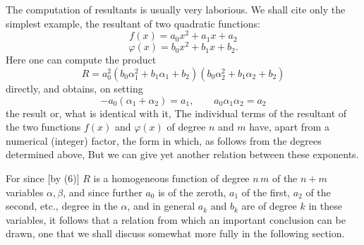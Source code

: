 
The computation of resultants is usually very laborious. We shall cite only the simplest example, the resultant of two quadratic functions:
\[
f(x) = a_0 x^2 + a_1 x + a_2
\]
\[
\varphi(x) = b_0 x^2 + b_1 x + b_2.
\]
Here one can compute the product
\[
R = a_0^2 (b_0 \alpha_1^2 + b_1 \alpha_1 + b_2) (b_0 \alpha_2^2 + b_1 \alpha_2 + b_2)
\]
directly, and obtains, on setting
\[
- a_0 (\alpha_1 + \alpha_2) = a_1, \qquad a_0 \alpha_1 \alpha_2 = a_2
\]
the result
or, what is identical with it,
The individual terms of the resultant of the two functions $f(x)$ and $\varphi(x)$ of degree $n$ and $m$ have, apart from a numerical (integer) factor, the form
in which, as follows from the degrees determined above,
But we can give yet another relation between these exponents.

For since [by (6)] $R$ is a homogeneous function of degree $n\,m$ of the $n+m$ variables $\alpha, \beta$, and since further $a_0$ is of the zeroth, $a_1$ of the first, $a_2$ of the second, etc., degree in the $\alpha$, and in general $a_k$ and $b_k$ are of degree $k$ in these variables, it follows that
a relation from which an important conclusion can be drawn, one that we shall discuss somewhat more fully in the following section.
